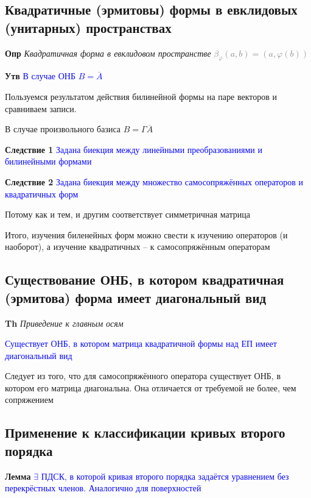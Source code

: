 \documentclass[a4paper, 14pt]{article}
\begin{document}
    \subsection{Квадратичные (эрмитовы) формы в евклидовых (унитарных) пространствах}
    
    \textbf{Опр} \textit{Квадратичная форма в евклидовом пространстве} \textcolor{gray}{$\beta_\varphi (a, b) = (a, \varphi(b))$}
    
    \textbf{Утв} \textcolor{blue}{В случае ОНБ $B = \overline{A}$}
    
    Пользуемся результатом действия билинейной формы на паре векторов и сравниваем записи.
    
    В случае произвольного базиса $B = \Gamma \overline{A}$
    
    \textbf{Следствие 1} \textcolor{blue}{Задана биекция между линейными преобразованиями и билинейными формами}
    
    \textbf{Следствие 2} \textcolor{blue}{Задана биекция между множество самосопряжённых операторов и квадратичных форм}
    
    Потому как и тем, и другим соответствует симметричная матрица
    
    Итого, изучения биленейных форм можно свести к изучению операторов (и наоборот), а изучение квадратичных -- к
    самосопряжённым операторам
    
    \subsection{Существование ОНБ, в котором квадратичная (эрмитова) форма имеет диагональный вид}
    
    \textbf{Th} \textit{Приведение к главным осям}
    
    \textcolor{blue}{Существует ОНБ, в котором матрица квадратичной формы над ЕП имеет диагональный вид}
    
    Следует из того, что для самосопряжённого оператора существует ОНБ, в котором его матрица диагональна.
    Она отличается от требуемой не более, чем сопряжением
    
    \subsection{Применение к классификации кривых второго порядка}
    
    \textbf{Лемма} \textcolor{blue}{$\exists$ ПДСК, в которой кривая второго порядка задаётся уравнением без
    перекрёстных членов. Аналогично для поверхностей}
    
\end{document}
